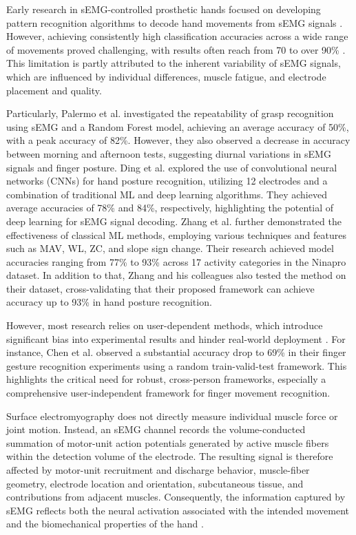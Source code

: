 \documentclass[preprint,12pt]{elsarticle}
\begin{document}
Early research in sEMG-controlled prosthetic hands focused on developing pattern recognition algorithms to decode hand movements from sEMG signals \cite{13,14}. However, achieving consistently high classification accuracies across a wide range of movements proved challenging, with results often reach from 70 to over 90\% \cite{15,Zhouping,s20030672,16,17,18}. This limitation is partly attributed to the inherent variability of sEMG signals, which are influenced by individual differences, muscle fatigue, and electrode placement and quality.

Particularly, Palermo et al. \cite{16} investigated the repeatability of grasp recognition using sEMG and a Random Forest model, achieving an average accuracy of 50\%, with a peak accuracy of 82\%. However, they also observed a decrease in accuracy between morning and afternoon tests, suggesting diurnal variations in sEMG signals and finger posture. Ding et al.\cite{17} explored the use of convolutional neural networks (CNNs) for hand posture recognition, utilizing 12 electrodes and a combination of traditional ML and deep learning algorithms. They achieved average accuracies of 78\% and 84\%, respectively, highlighting the potential of deep learning for sEMG signal decoding. Zhang et al.\cite{18} further demonstrated the effectiveness of classical ML methods, employing various techniques and features such as MAV, WL, ZC, and slope sign change. Their research achieved model accuracies ranging from 77\% to 93\% across 17 activity categories in the Ninapro dataset. In addition to that, Zhang and his colleagues also tested the method on their dataset, cross-validating that their proposed framework can achieve accuracy up to 93\% in hand posture recognition.

However, most research relies on user-dependent methods, which introduce significant bias into experimental results and hinder real-world deployment \cite{13,14,15,Zhouping,17,18}. For instance, Chen et al. \cite{s20030672} observed a substantial accuracy drop to 69\% in their finger gesture recognition experiments using a random train-valid-test framework. This highlights the critical need for robust, cross-person frameworks, especially a comprehensive user-independent framework for finger movement recognition.

Surface electromyography does not directly measure individual muscle force or joint motion. Instead, an sEMG channel records the volume-conducted summation of motor-unit action potentials generated by active muscle fibers within the detection volume of the electrode. The resulting signal is therefore affected by motor-unit recruitment and discharge behavior, muscle-fiber geometry, electrode location and orientation, subcutaneous tissue, and contributions from adjacent muscles. Consequently, the information captured by sEMG reflects both the neural activation associated with the intended movement and the biomechanical properties of the hand \cite{s21217322, alcan2023current}. 
\end{document}
